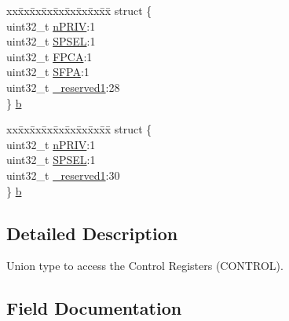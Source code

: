 \begin{DoxyCompactItemize}
\begin{tabbing}
\end{tabbing}\item 
\begin{tabbing}
xx\=xx\=xx\=xx\=xx\=xx\=xx\=xx\=xx\=\kill
struct \{\\
\>uint32\_t \mbox{\hyperlink{union_c_o_n_t_r_o_l___type_a2a6e513e8a6bf4e58db169e312172332}{nPRIV}}:1\\
\>uint32\_t \mbox{\hyperlink{union_c_o_n_t_r_o_l___type_ae185aac93686ffc78e998a9daf41415b}{SPSEL}}:1\\
\>uint32\_t \mbox{\hyperlink{union_c_o_n_t_r_o_l___type_a2518558c090f60161ba4e718a54ee468}{FPCA}}:1\\
\>uint32\_t \mbox{\hyperlink{union_c_o_n_t_r_o_l___type_a40e45b21a6a619be3b6d5ce9c5bc5ffb}{SFPA}}:1\\
\>uint32\_t \mbox{\hyperlink{union_c_o_n_t_r_o_l___type_a959a73d8faee56599b7e792a7c5a2d16}{\_reserved1}}:28\\
\} \mbox{\hyperlink{union_c_o_n_t_r_o_l___type_ae03cf62a84c9224544bebc7eed2d730d}{b}}\\

\end{tabbing}\item 
\begin{tabbing}
xx\=xx\=xx\=xx\=xx\=xx\=xx\=xx\=xx\=\kill
struct \{\\
\>uint32\_t \mbox{\hyperlink{union_c_o_n_t_r_o_l___type_a2a6e513e8a6bf4e58db169e312172332}{nPRIV}}:1\\
\>uint32\_t \mbox{\hyperlink{union_c_o_n_t_r_o_l___type_ae185aac93686ffc78e998a9daf41415b}{SPSEL}}:1\\
\>uint32\_t \mbox{\hyperlink{union_c_o_n_t_r_o_l___type_a959a73d8faee56599b7e792a7c5a2d16}{\_reserved1}}:30\\
\} \mbox{\hyperlink{union_c_o_n_t_r_o_l___type_af4d0bc452c05232ea0cedfee5a4d3139}{b}}\\

\end{tabbing}\end{DoxyCompactItemize}


\subsection{Detailed Description}
Union type to access the Control Registers (C\+O\+N\+T\+R\+OL). 

\subsection{Field Documentation}
\mbox{\label{union_c_o_n_t_r_o_l___type_a959a73d8faee56599b7e792a7c5a2d16}} 

